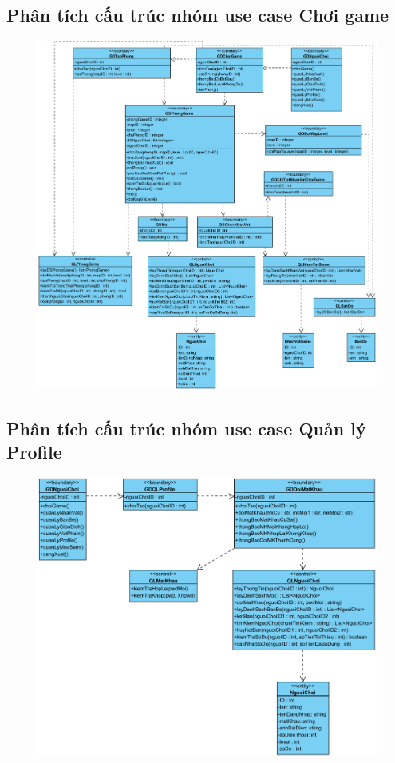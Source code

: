 \documentclass[3p]{elsarticle}
\begin{document}
\subsection{Phân tích cấu trúc nhóm use case Chơi game}
\begin{figure}[!htbp]
	\hspace*{-.5in}
	\centering
	\includegraphics[scale=.55]{images/structure-pdfs/gamer/PlayGame.pdf}
\end{figure}
\newpage
\subsection{Phân tích cấu trúc nhóm use case Quản lý Profile}
\begin{figure}[!htbp]
	\hspace*{-.5in}
	\centering
	\includegraphics[scale=.55]{images/structure-pdfs/gamer/ProfileManagement.pdf}
\end{figure}
\newpage
\end{document}
